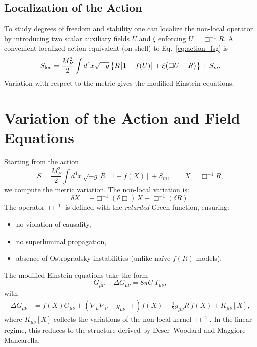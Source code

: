 \documentclass[11pt,a4paper]{article}
\begin{document}
\begin{onehalfspacing}
\subsection{Localization of the Action}
To study degrees of freedom and stability one can localize the non-local operator by introducing two scalar auxiliary fields $U$ and $\xi$ enforcing $U=\Box^{-1}R$.
A convenient localized action equivalent (on-shell) to Eq.~\eqref{eq:action_fsg} is
\begin{equation}
S_{\rm loc}=\frac{M_P^2}{2}\int d^4x\sqrt{-g}\left\{R\bigl[1+f(U)\bigr]+\xi\bigl(\Box U-R\bigr)\right\}+S_m.
\label{eq:Sloc}
\end{equation}
Variation with respect to the metric gives the modified Einstein equations.
\newpage
\section{Variation of the Action and Field Equations}
Starting from the action
\begin{equation}
S = \frac{M_P^2}{2}\int d^4x\,\sqrt{-g}\,
R\,[1+f(X)] + S_m ,
\qquad X = \Box^{-1} R ,
\label{eq:action2}
\end{equation}
we compute the metric variation. The non-local variation is:
\begin{equation}
\delta X = -\Box^{-1}(\delta\Box)\,X + \Box^{-1}(\delta R).
\label{eq:deltaX}
\end{equation}
The operator $\Box^{-1}$ is defined with the \emph{retarded} Green function,
ensuring:
\begin{itemize}
    \item no violation of causality,
    \item no superluminal propagation,
    \item absence of Ostrogradsky instabilities (unlike naïve $f(R)$ models).
\end{itemize}
The modified Einstein equations take the form
\begin{equation}
G_{\mu\nu} + \Delta G_{\mu\nu}
= 8\pi G\,T_{\mu\nu},
\label{eq:einstein_modified}
\end{equation}
with
\begin{align}
\Delta G_{\mu\nu}
&= f(X) G_{\mu\nu}
 + \left(\nabla_\mu \nabla_\nu - g_{\mu\nu}\Box\right) f(X)
 - \frac{1}{2} g_{\mu\nu} R\, f(X)
 + K_{\mu\nu}[X],
\label{eq:DeltaG}
\end{align}
where $K_{\mu\nu}[X]$ collects the variations of the non-local kernel
$\Box^{-1}$. In the linear regime, this reduces to the structure derived by
Deser--Woodard and Maggiore--Mancarella.

\end{onehalfspacing}
\end{document}
